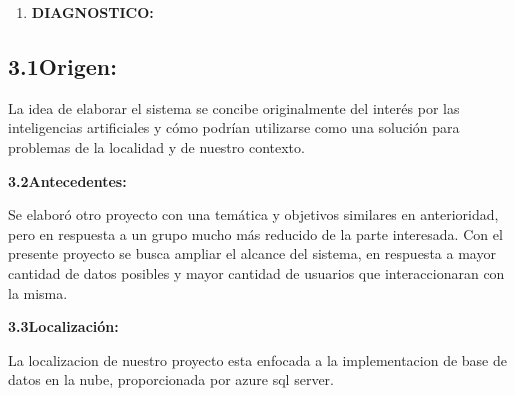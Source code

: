 \documentclass[12pt]{report}
\begin{document}
\vspace{\baselineskip}

\vspace{\baselineskip}
\begin{enumerate}
	\item \textbf{DIAGNOSTICO:}\par


\end{enumerate}\subsection*{3.1\hspace*{10pt}Origen:}
{\fontsize{10pt}{12.0pt}\selectfont La idea de elaborar el sistema se concibe originalmente del interés por las inteligencias artificiales y cómo podrían utilizarse como una solución para problemas de la localidad y de nuestro contexto.\par}\par

\textbf{3.2\tab Antecedentes:}\par

{\fontsize{10pt}{12.0pt}\selectfont Se elaboró otro proyecto con una temática y objetivos similares en anterioridad, pero en respuesta a un grupo mucho más reducido de la parte interesada. Con el presente proyecto se busca ampliar el alcance del sistema, en respuesta a mayor cantidad de datos posibles y mayor cantidad de usuarios que interaccionaran con la misma.\par}\par


\vspace{\baselineskip}
\textbf{3.3\tab Localización:}\par

{\fontsize{10pt}{12.0pt}\selectfont La localizacion de nuestro proyecto esta enfocada a la implementacion de base de datos en la nube, proporcionada por azure sql server.\par}\par
\end{document}
